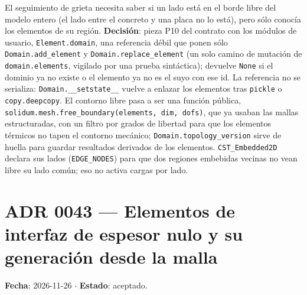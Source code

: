 \documentclass[11pt,oneside]{report}
\begin{document}
El seguimiento de grieta necesita saber si un lado está en el borde libre del modelo entero (el lado entre el concreto y una placa no lo está), pero sólo conocía los elementos de su región. \textbf{Decisión}: pieza P10 del contrato con los módulos de usuario, \texttt{Element.domain}, una referencia débil que ponen sólo \texttt{Domain.\allowbreak{}add\_\allowbreak{}element} y \texttt{Domain.\allowbreak{}replace\_\allowbreak{}element} (un solo camino de mutación de \texttt{domain.elements}, vigilado por una prueba sintáctica); devuelve \texttt{None} si el dominio ya no existe o el elemento ya no es el suyo con ese id. La referencia no se serializa: \texttt{Domain.\allowbreak{}\_\allowbreak{}\_\allowbreak{}setstate\_\allowbreak{}\_\allowbreak{}} vuelve a enlazar los elementos tras \texttt{pickle} o \texttt{copy.deepcopy}. El contorno libre pasa a ser una función pública, \texttt{solidum.\allowbreak{}mesh.\allowbreak{}free\_\allowbreak{}boundary(elements, dim, dofs)}, que ya usaban las mallas estructuradas, con un filtro por grados de libertad para que los elementos térmicos no tapen el contorno mecánico; \texttt{Domain.\allowbreak{}topology\_\allowbreak{}version} sirve de huella para guardar resultados derivados de los elementos. \texttt{CST\_Embedded2D} declara sus lados (\texttt{EDGE\_NODES}) para que dos regiones embebidas vecinas no vean libre su lado común; eso no activa cargas por lado.

\section{ADR 0043 --- Elementos de interfaz de espesor nulo y su generación desde la malla}
\label{adr:0043}

\textbf{Fecha}: 2026-11-26 \ensuremath{\cdot} \textbf{Estado}: aceptado.
\end{document}
